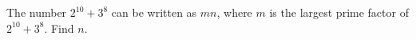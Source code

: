 The number $2^{10}+3^8$ can be written as $mn$, where $m$ is the largest prime factor of $2^{10}+3^8$. Find $n$.
